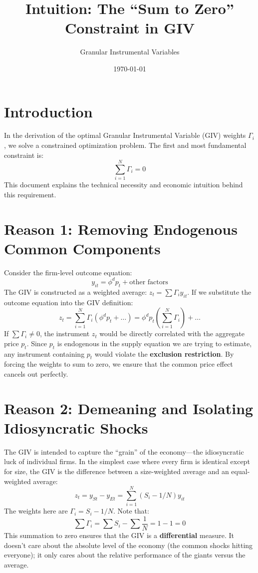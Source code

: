 \documentclass[12pt]{article}
\title{\bfseries Intuition: The ``Sum to Zero'' Constraint in GIV}
\author{Granular Instrumental Variables}
\date{\today}
\begin{document}
\maketitle

\section{Introduction}
In the derivation of the optimal Granular Instrumental Variable (GIV) weights $\Gamma_i$, we solve a constrained optimization problem. The first and most fundamental constraint is:
\begin{equation}
    \sum_{i=1}^N \Gamma_i = 0 \tag{Constraint 1: Sum to Zero}
\end{equation}
This document explains the technical necessity and economic intuition behind this requirement.

\section{Reason 1: Removing Endogenous Common Components}
Consider the firm-level outcome equation:
\begin{equation}
    y_{it} = \phi^d p_t + \text{other factors}
\end{equation}
The GIV is constructed as a weighted average: $z_t = \sum \Gamma_i y_{it}$. If we substitute the outcome equation into the GIV definition:
\begin{equation}
    z_t = \sum_{i=1}^N \Gamma_i (\phi^d p_t + \dots) = \phi^d p_t \left( \sum_{i=1}^N \Gamma_i \right) + \dots
\end{equation}
If $\sum \Gamma_i \neq 0$, the instrument $z_t$ would be directly correlated with the aggregate price $p_t$. Since $p_t$ is endogenous in the supply equation we are trying to estimate, any instrument containing $p_t$ would violate the \textbf{exclusion restriction}. By forcing the weights to sum to zero, we ensure that the common price effect cancels out perfectly.

\section{Reason 2: Demeaning and Isolating Idiosyncratic Shocks}
The GIV is intended to capture the ``grain'' of the economy—the idiosyncratic luck of individual firms. In the simplest case where every firm is identical except for size, the GIV is the difference between a size-weighted average and an equal-weighted average:
\begin{equation}
    z_t = y_{St} - y_{Et} = \sum_{i=1}^N (S_i - 1/N) y_{it}
\end{equation}
The weights here are $\Gamma_i = S_i - 1/N$. Note that:
\begin{equation}
    \sum \Gamma_i = \sum S_i - \sum \frac{1}{N} = 1 - 1 = 0
\end{equation}
This summation to zero ensures that the GIV is a \textbf{differential} measure. It doesn't care about the absolute level of the economy (the common shocks hitting everyone); it only cares about the relative performance of the giants versus the average.
\end{document}

